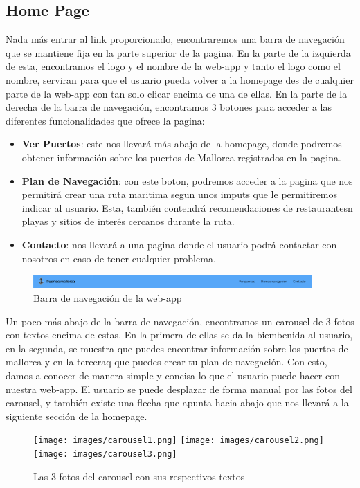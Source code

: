 \documentclass{article}
\begin{document}
\subsection{Home Page}
Nada más entrar al link proporcionado, encontraremos una barra de navegación que se mantiene fija en la parte superior de la pagina. En la parte de la izquierda de esta, encontramos el logo y el nombre de la web-app y tanto el logo como el nombre, serviran para que el usuario pueda volver a la homepage des de cualquier parte de la web-app con tan solo clicar encima de una de ellas. En la parte de la derecha de la barra de navegación, encontramos 3 botones para acceder a las diferentes funcionalidades que ofrece la pagina:
\begin{itemize}
    \item \textbf{Ver Puertos}: este nos llevará más abajo de la homepage, donde podremos obtener información sobre los puertos de Mallorca registrados en la pagina.
    \item \textbf{Plan de Navegación}: con este boton, podremos acceder a la pagina que nos permitirá crear una ruta maritima segun unos imputs que le permitiremos indicar al usuario. Esta, también contendrá recomendaciones de restaurantesn playas y sitios de interés cercanos durante la ruta.
    \item \textbf{Contacto}: nos llevará a una pagina donde el usuario podrá contactar con nosotros en caso de tener cualquier problema.
\end{itemize}
\begin{figure}[ht]
    \centering
    \includegraphics[width=0.95\textwidth]{images/nvbar.png}
    \caption{Barra de navegación de la web-app}
\end{figure}
Un poco más abajo de la barra de navegación, encontramos un carousel de 3 fotos con textos encima de estas. En la primera de ellas se da la biembenida al usuario, en la segunda, se muestra que puedes encontrar información sobre los puertos de mallorca y en la terceraq que puedes crear tu plan de navegación. Con esto, damos a conocer de manera simple y concisa lo que el usuario puede hacer con nuestra web-app. El usuario se puede desplazar de forma manual por las fotos del carousel, y también existe una flecha que apunta hacia abajo que nos llevará a la siguiente sección de la homepage.
\newpage
\begin{figure}[ht]
    \centering
    \texttt{[image: images/carousel1.png]}
    \texttt{[image: images/carousel2.png]}
    \texttt{[image: images/carousel3.png]}
    \caption{Las 3 fotos del carousel con sus respectivos textos}
\end{figure}
\end{document}
